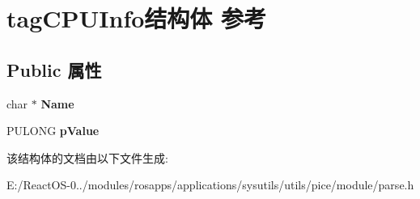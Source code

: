 \hypertarget{structtag_c_p_u_info}{}\section{tag\+C\+P\+U\+Info结构体 参考}
\label{structtag_c_p_u_info}
\subsection*{Public 属性}
\begin{DoxyCompactItemize}
\item 
\mbox{\label{structtag_c_p_u_info_a2e35cc67f259d6beb1e2c502e8aac628}} 
char $\ast$ {\bfseries Name}
\item 
\mbox{\label{structtag_c_p_u_info_a6119a00e0623b50b8611e64bcb8ba855}} 
P\+U\+L\+O\+NG {\bfseries p\+Value}
\end{DoxyCompactItemize}


该结构体的文档由以下文件生成\+:\begin{DoxyCompactItemize}
\item 
E\+:/\+React\+O\+S-\/0../modules/rosapps/applications/sysutils/utils/pice/module/parse.\+h\end{DoxyCompactItemize}
